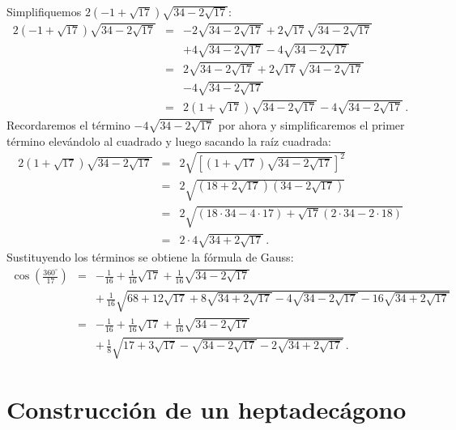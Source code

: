 Simplifiquemos $2(-1+\sqrt{17})\sqrt{34-2\sqrt{17}}$:
\begin{eqnarray*}
2(-1+\sqrt{17})\sqrt{34-2\sqrt{17}} &=&
-2\sqrt{34-2\sqrt{17}} +2\sqrt{17}\sqrt{34-2\sqrt{17}}\\
&&+4\sqrt{34-2\sqrt{17}}-4\sqrt{34-2\sqrt{17}}\\
&=&
2\sqrt{34-2\sqrt{17}} +2\sqrt{17}\sqrt{34-2\sqrt{17}}\\
&&-4\sqrt{34-2\sqrt{17}}\\
&=&2(1+\sqrt{17})\sqrt{34-2\sqrt{17}}-4\sqrt{34-2\sqrt{17}}\,.
\end{eqnarray*}
Recordaremos el término $-4\sqrt{34-2\sqrt{17}}$ por ahora y simplificaremos el primer término elevándolo al cuadrado y luego sacando la raíz cuadrada:
\begin{eqnarray*}
2(1+\sqrt{17})\sqrt{34-2\sqrt{17}}&=&
2\sqrt{\left[(1+\sqrt{17})\sqrt{34-2\sqrt{17}}\right]^2}\\
&=&2\sqrt{(18+2\sqrt{17})(34-2\sqrt{17})}\\
&=&2\sqrt{(18\cdot 34-4\cdot17)+\sqrt{17}(2\cdot 34 - 2\cdot 18)}\\
&=&2\cdot 4\sqrt{34+2\sqrt{17}}\,.
\end{eqnarray*}
Sustituyendo los términos se obtiene la fórmula de Gauss:
\begin{eqnarray*}
\cos\left(\frac{360^\circ}{17}\right) &=&
-\frac{1}{16}+\frac{1}{16}\sqrt{17} + 
     \frac{1}{16}\sqrt{34-2\sqrt{17}} \\
    &&
     +\,\frac{1}{16}\sqrt{
     68+12\sqrt{17} + 
     8\sqrt{34+2\sqrt{17}}-4\sqrt{34-2\sqrt{17}}
   -16
     \sqrt{34+2\sqrt{17}}
   }\\
&=&-\frac{1}{16}+\frac{1}{16}\sqrt{17} + 
     \frac{1}{16}\sqrt{34-2\sqrt{17}}\\
&&+\,\frac{1}{8}\sqrt{
     17+3\sqrt{17} - 
     \sqrt{34-2\sqrt{17}}
   -2
     \sqrt{34+2\sqrt{17}}
   }\,.
\end{eqnarray*}

\section{Construcción de un heptadecágono}\label{s.construction}

